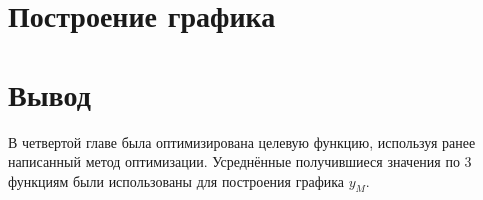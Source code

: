 \documentclass[a4paper, 12pt]{article}
\begin{document}



\section{Построение графика}
\begin{center}
\end{center}

\section{Вывод}

В четвертой главе была оптимизирована целевую функцию, используя ранее написанный метод оптимизации. Усреднённые получившиеся значения по 3 функциям были использованы для построения графика  $y_M$.
\end{document}
